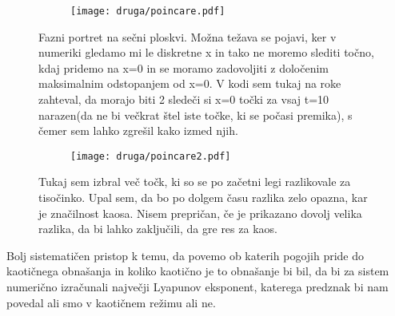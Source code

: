 \documentclass{article}
\begin{document}
\begin{figure}[H]
\centering
\begin{subfigure}{\textwidth}
\texttt{[image: druga/poincare.pdf]}
\end{subfigure}
\caption*{Fazni portret na sečni ploskvi. Možna težava se pojavi, ker v numeriki gledamo mi le diskretne x in tako ne moremo slediti točno, kdaj pridemo na x=0 in se moramo zadovoljiti z določenim maksimalnim odstopanjem od x=0. V kodi sem tukaj na roke zahteval, da morajo biti 2 sledeči si x=0 točki za vsaj t=10 narazen(da ne bi večkrat štel iste točke, ki se počasi premika), s čemer sem lahko zgrešil kako izmed njih.}
\end{figure}

\begin{figure}[H]
\centering
\begin{subfigure}{\textwidth}
\texttt{[image: druga/poincare2.pdf]}
\end{subfigure}
\caption*{Tukaj sem izbral več točk, ki so se po začetni legi razlikovale za tisočinko. Upal sem, da bo po dolgem času razlika zelo opazna, kar je značilnost kaosa. Nisem prepričan, če je prikazano dovolj velika razlika, da bi lahko zaključili, da gre res za kaos.}
\end{figure}

Bolj sistematičen pristop k temu, da povemo ob katerih pogojih pride do kaotičnega obnašanja in koliko kaotično je to obnašanje bi bil, da bi za sistem numerično izračunali največji Lyapunov eksponent, katerega predznak bi nam povedal ali smo v kaotičnem režimu ali ne.
\end{document}
